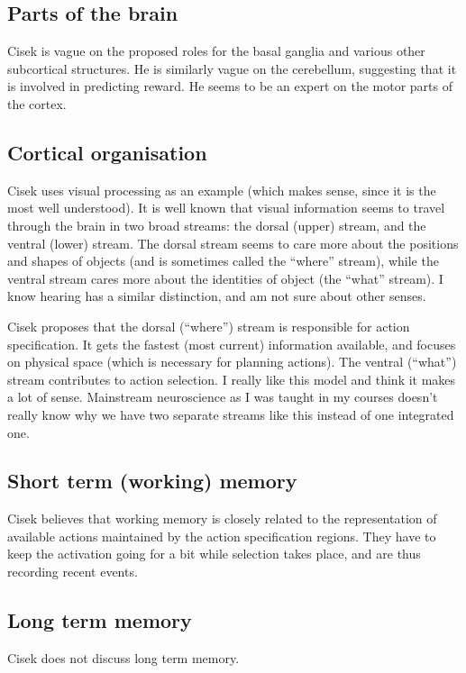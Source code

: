 \documentclass[10pt,a4paper]{article}
\newcommand{\nquote}[1]{``{#1}''}
\begin{document}
\subsection{Parts of the brain}
Cisek is vague on the proposed roles for the basal ganglia and various other subcortical structures. He is similarly vague on the cerebellum, suggesting that it is involved in predicting reward. He seems to be an expert on the motor parts of the cortex.

\subsection{Cortical organisation}
Cisek uses visual processing as an example (which makes sense, since it is the most well understood). It is well known that visual information seems to travel through the brain in two broad streams: the dorsal (upper) stream, and the ventral (lower) stream. The dorsal stream seems to care more about the positions and shapes of objects (and is sometimes called the \nquote{where} stream), while the ventral stream cares more about the identities of object (the \nquote{what} stream). I know hearing has a similar distinction, and am not sure about other senses.

Cisek proposes that the dorsal (\nquote{where}) stream is responsible for action specification. It gets the fastest (most current) information available, and focuses on physical space (which is necessary for planning actions). The ventral (\nquote{what}) stream contributes to action selection. I really like this model and think it makes a lot of sense. Mainstream neuroscience as I was taught in my courses doesn't really know why we have two separate streams like this instead of one integrated one.

\subsection{Short term (working) memory}
Cisek believes that working memory is closely related to the representation of available actions maintained by the action specification regions. They have to keep the activation going for a bit while selection takes place, and are thus recording recent events.

\subsection{Long term memory}
Cisek does not discuss long term memory.
\end{document}
